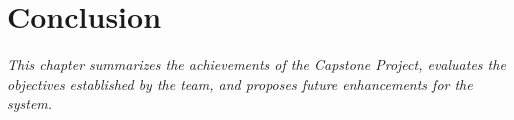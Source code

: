 \documentclass[12pt]{report}
\begin{document}
\chapter{Conclusion}
\textit{This chapter summarizes the achievements of the Capstone Project, evaluates the objectives established by the team, and proposes future enhancements for the system.}





\end{document}
